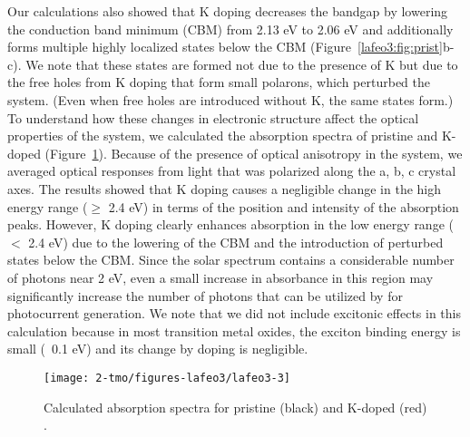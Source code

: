 Our calculations also showed that K doping decreases the bandgap by lowering the conduction band minimum (CBM) from 2.13 eV to 2.06 eV and additionally forms multiple highly localized states below the CBM (Figure~\ref{lafeo3:fig:prist}b-c). We note that these states are formed not due to the presence of K but due to the free holes from K doping that form small polarons, which perturbed the system. (Even when free holes are introduced without K, the same states form.) To understand how these changes in electronic structure affect the optical properties of the system, we calculated the absorption spectra of pristine and K-doped  (Figure~\ref{lafeo3:fig:optical}). Because of the presence of optical anisotropy in the system, we averaged optical responses from light that was polarized along the a, b, c crystal axes. The results showed that K doping causes a negligible change in the high energy range ($\geq$ 2.4 eV) in terms of the position and intensity of the absorption peaks. However, K doping clearly enhances absorption in the low energy range ($<$ 2.4 eV) due to the lowering of the CBM and the introduction of perturbed states below the CBM. Since the solar spectrum contains a considerable number of photons near 2 eV, even a small increase in absorbance in this region may significantly increase the number of photons that can be utilized by  for photocurrent generation. We note that we did not include excitonic effects in this calculation because in most transition metal oxides, the exciton binding energy is small (~0.1 eV) and its change by doping is negligible.~\cite{kim2015simultaneous,Ping2013,ping2014optimizing}


\begin{figure}
    \centering
    \texttt{[image: 2-tmo/figures-lafeo3/lafeo3-3]}
    \caption{
        Calculated absorption spectra for pristine (black) and K-doped (red) .
    }
    \label{lafeo3:fig:optical}
\end{figure}


